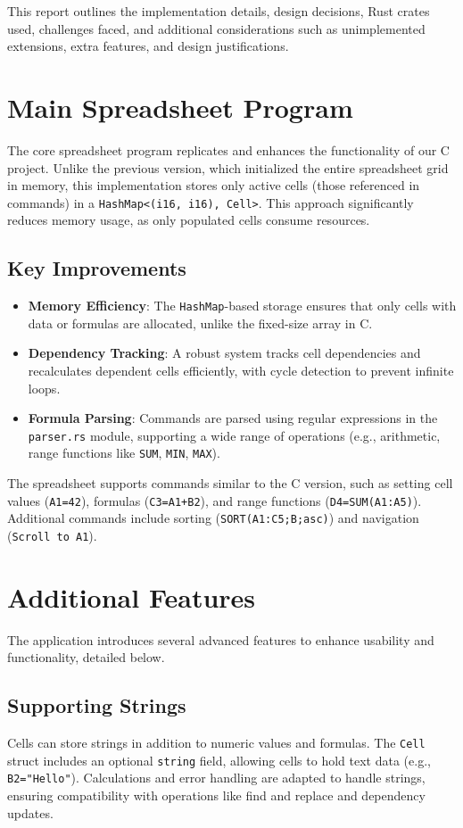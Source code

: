 \documentclass{article}
\begin{document}
This report outlines the implementation details, design decisions, Rust crates used, challenges faced, and additional considerations such as unimplemented extensions, extra features, and design justifications.

\section{Main Spreadsheet Program}
The core spreadsheet program replicates and enhances the functionality of our C project. Unlike the previous version, which initialized the entire spreadsheet grid in memory, this implementation stores only active cells (those referenced in commands) in a \texttt{HashMap<(i16, i16), Cell>}. This approach significantly reduces memory usage, as only populated cells consume resources.

\subsection{Key Improvements}
\begin{itemize}
    \item \textbf{Memory Efficiency}: The \texttt{HashMap}-based storage ensures that only cells with data or formulas are allocated, unlike the fixed-size array in C.
    \item \textbf{Dependency Tracking}: A robust system tracks cell dependencies and recalculates dependent cells efficiently, with cycle detection to prevent infinite loops.
    \item \textbf{Formula Parsing}: Commands are parsed using regular expressions in the \texttt{parser.rs} module, supporting a wide range of operations (e.g., arithmetic, range functions like \texttt{SUM}, \texttt{MIN}, \texttt{MAX}).
\end{itemize}

The spreadsheet supports commands similar to the C version, such as setting cell values (\texttt{A1=42}), formulas (\texttt{C3=A1+B2}), and range functions (\texttt{D4=SUM(A1:A5)}). Additional commands include sorting (\texttt{SORT(A1:C5;B;asc)}) and navigation (\texttt{Scroll to A1}).

\section{Additional Features}
The application introduces several advanced features to enhance usability and functionality, detailed below.

\subsection{Supporting Strings}
Cells can store strings in addition to numeric values and formulas. The \texttt{Cell} struct includes an optional \texttt{string} field, allowing cells to hold text data (e.g., \texttt{B2="Hello"}). Calculations and error handling are adapted to handle strings, ensuring compatibility with operations like find and replace and dependency updates.
\end{document}
